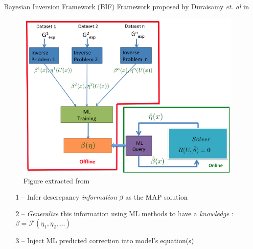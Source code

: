 \documentclass[10pt,
			   xcolor=svgnames,
			   hyperref={linkcolor=red, citecolor = DarkGreen, colorlinks=true, urlcolor=Navy}]{beamer}
\newcommand{\bepar}[1]{
	\left( #1 \right)  
}
\newcommand\bk{\color{black}}
\begin{document}
\begin{frame}{Bayesian Inversion Framework (BIF)}
Framework proposed by Duraisamy \textit{et. al} in \citep{parish2016paradigm}
\begin{multicols*}{2}
\noindent
	\begin{figure}[!ht]
	\centering
	\includegraphics[scale=0.3]{singh.png}
	\caption{Figure extracted from \citep{singh2017machine}}
	\end{figure}
	
	\columnbreak

	\begin{itemize}
	\item[1 --] Infer descrepancy \color{BlueViolet} \textit{information} \bk $\beta$ as the MAP solution \\[5mm]
	
	\item[2 --]	\textit{Generalize} this information using ML methods to have a \color{BlueViolet} \textit{knowledge} \bk: $\beta = \mathcal{F}\bepar{\eta_1, \eta_2,...}$ \\[5mm]
 
	\item[3 --] Inject ML predicted correction into model's equation(s) \\[5mm]
	
	\end{itemize}
			
\end{multicols*}
\end{frame}
\end{document}
